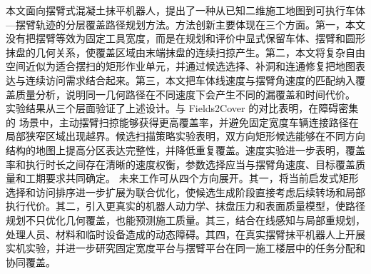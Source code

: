 \markdownRendererDocumentBegin
\markdownRendererSectionBegin
{}\markdownRendererParagraphSeparator
{}本文面向摆臂式混凝土抹平机器人，提出了一种从已知二维施工地图到可执行车体—摆臂轨迹的分层覆盖路径规划方法。方法创新主要体现在三个方面。第一，本文没有把摆臂等效为固定工具宽度，而是在规划和评价中显式保留车体、摆臂和圆形抹盘的几何关系，使覆盖区域由末端抹盘的连续扫掠产生。第二，本文将复杂自由空间近似为适合摆扫的矩形作业单元，并通过候选选择、补洞和连通修复把地图表达与连续访问需求结合起来。第三，本文把车体线速度与摆臂角速度的匹配纳入覆盖质量分析，说明同一几何路径在不同速度下会产生不同的漏覆盖和时间代价。\markdownRendererParagraphSeparator
{}实验结果从三个层面验证了上述设计。与 Fields2Cover 的对比表明，在障碍密集的  场景中，主动摆臂扫掠能够获得更高覆盖率，并避免固定宽度车辆连接路径在局部狭窄区域出现越界。候选扫描策略实验表明，双方向矩形候选能够在不同方向结构的地图上提高分区表达完整性，并降低重复覆盖。速度实验进一步表明，覆盖率和执行时长之间存在清晰的速度权衡，参数选择应当与摆臂角速度、目标覆盖质量和工期要求共同确定。\markdownRendererParagraphSeparator
{}未来工作可从四个方向展开。其一，将当前启发式矩形选择和访问排序进一步扩展为联合优化，使候选生成阶段直接考虑后续转场和局部执行代价。其二，引入更真实的机器人动力学、抹盘压力和表面质量模型，使路径规划不只优化几何覆盖，也能预测施工质量。其三，结合在线感知与局部重规划，处理人员、材料和临时设备造成的动态障碍。其四，在真实摆臂抹平机器人上开展实机实验，并进一步研究固定宽度平台与摆臂平台在同一施工楼层中的任务分配和协同覆盖。
\markdownRendererSectionEnd \markdownRendererDocumentEnd